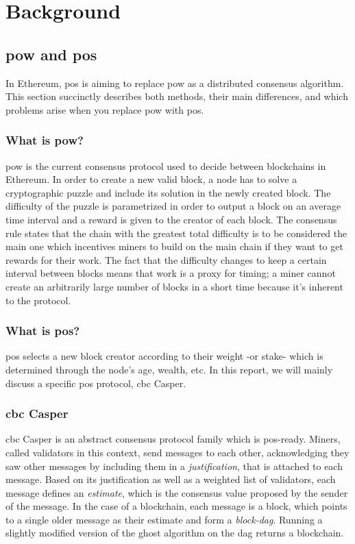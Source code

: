 \chapter{Background}
\label{chap:background}

\section{\gls{pow} and \gls{pos}}
In Ethereum, \gls{pos} is aiming to replace \gls{pow} as a distributed consensus
algorithm. This section succinctly describes both methods, their main
differences, and which problems arise when you replace \gls{pow} with \gls{pos}.

\subsection{What is \gls{pow}?}
\gls{pow} is the current consensus protocol used to decide between blockchains
in Ethereum. In order to create a new valid block, a node has to solve a
cryptographic puzzle and include its solution in the newly created block. The
difficulty of the puzzle is parametrized in order to output a block on an
average time interval and a reward is given to the creator of each block.  The
consensus rule states that the chain with the greatest total difficulty is to be
considered the main one which incentives miners to build on the main chain if
they want to get rewards for their work. The fact that the difficulty changes to
keep a certain interval between blocks means that work is a proxy for timing; a
miner cannot create an arbitrarily large number of blocks in a short time
because it's inherent to the protocol.


\subsection{What is \gls{pos}?}
\gls{pos} selects a new block creator according to their weight -or stake- which
is determined through the node's age, wealth, etc. In this report, we will
mainly discuss a specific \gls{pos} protocol, \gls{cbc} Casper.

\subsection{\gls{cbc} Casper}
\label{ssec:cbc}
\FloatBarrier
\gls{cbc} Casper \cite{abstractCBC} \cite{abstractCBC2} is an abstract consensus
protocol family which is \gls{pos}-ready. Miners, called validators in this
context, send messages to each other, acknowledging they saw other messages by
including them in a \textit{justification}, that is attached to each message.
Based on its justification as well as a weighted list of validators, each
message defines an \textit{estimate}, which is the consensus value proposed by
the sender of the message. In the case of a blockchain, each message is a block, which points to a
single older message as their estimate and form a \textit{block-\gls{dag}}. Running
a slightly modified version of the \gls{ghost} algorithm on the \gls{dag}
\cite{abstractCBC} \cite{GHOST} returns a blockchain.

